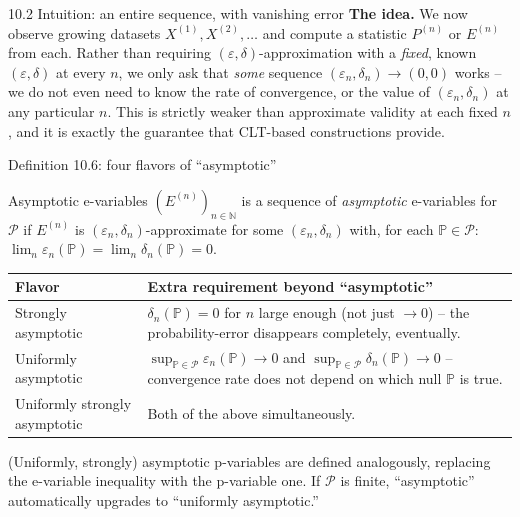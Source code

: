 \documentclass[aspectratio=169,10pt]{beamer}
\newcommand{\N}{\mathbb{N}}
\newcommand{\Pb}{\mathbb{P}}
\newcommand{\calP}{\mathcal{P}}
\begin{document}
\begin{frame}{10.2 Intuition: an entire sequence, with vanishing error}
  \textbf{The idea.} We now observe growing datasets $X^{(1)}, X^{(2)}, \dots$ and compute a statistic $P^{(n)}$ or $E^{(n)}$ from each. Rather than requiring $(\varepsilon,\delta)$-approximation with a \emph{fixed}, known $(\varepsilon,\delta)$ at every $n$, we only ask that \emph{some} sequence $(\varepsilon_n,\delta_n)\to(0,0)$ works -- we do not even need to know the rate of convergence, or the value of $(\varepsilon_n,\delta_n)$ at any particular $n$. This is strictly weaker than approximate validity at each fixed $n$, and it is exactly the guarantee that CLT-based constructions provide.
\end{frame}

\begin{frame}{Definition 10.6: four flavors of ``asymptotic''}
  \begin{block}{Asymptotic e-variables}
    $(E^{(n)})_{n\in\N}$ is a sequence of \emph{asymptotic} e-variables for $\calP$ if $E^{(n)}$ is $(\varepsilon_n,\delta_n)$-approximate for some $(\varepsilon_n,\delta_n)$ with, for each $\Pb\in\calP$: $\lim_n \varepsilon_n(\Pb) = \lim_n \delta_n(\Pb) = 0$.
  \end{block}
  \begin{tabular}{@{}p{3.4cm}p{8.8cm}@{}}
    \toprule
    \textbf{Flavor} & \textbf{Extra requirement beyond ``asymptotic''} \\
    \midrule
    Strongly asymptotic & $\delta_n(\Pb)=0$ for $n$ large enough (not just $\to0$) -- the probability-error disappears completely, eventually. \\
    Uniformly asymptotic & $\sup_{\Pb\in\calP}\varepsilon_n(\Pb)\to0$ and $\sup_{\Pb\in\calP}\delta_n(\Pb)\to0$ -- convergence rate does not depend on which null $\Pb$ is true. \\
    Uniformly strongly asymptotic & Both of the above simultaneously. \\
    \bottomrule
  \end{tabular}
  (Uniformly, strongly) asymptotic p-variables are defined analogously, replacing the e-variable inequality with the p-variable one. If $\calP$ is finite, ``asymptotic'' automatically upgrades to ``uniformly asymptotic.''
\end{frame}
\end{document}

